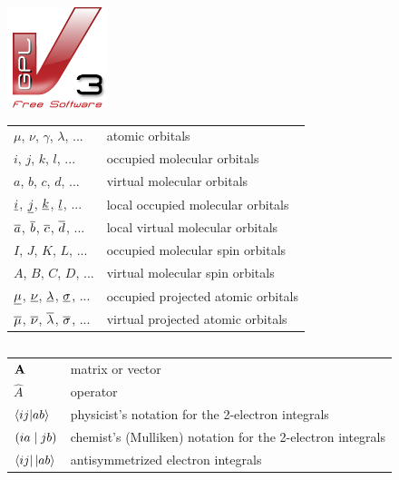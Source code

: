 \documentclass[a4paper,12pt]{book}
\begin{document}
\noindent 
\includegraphics[scale=1.0]{Pics/license}


\newpage

\newpage


{
\setlength{\tabcolsep}{14pt}
\renewcommand{\arraystretch}{1.5}
\begin{longtable}[l]{ll}
$\mu$, $\nu$, $\gamma$, $\lambda$, ... & atomic orbitals \\
$i$, $j$, $k$, $l$, ... & occupied molecular orbitals \\
$a$, $b$, $c$, $d$, ... & virtual molecular orbitals \\
$\underline{i}$, $\underline{j}$, $\underline{k}$, $\underline{l}$, ... & local occupied molecular orbitals \\
$\overline{a}$, $\overline{b}$, $\overline{c}$, $\overline{d}$, ... & local virtual molecular orbitals \\
$I$, $J$, $K$, $L$, ... & occupied molecular spin orbitals \\
$A$, $B$, $C$, $D$, ... & virtual molecular spin orbitals \\
$\underline{\mu}$, $\underline{\nu}$, $\underline{\lambda}$, $\underline{\sigma}$, ... & occupied projected atomic orbitals \\
$\overline{\mu}$, $\overline{\nu}$, $\overline{\lambda}$, $\overline{\sigma}$, ... & virtual projected atomic orbitals
\end{longtable}
}

\vspace{0.5cm}

{
\setlength{\tabcolsep}{14pt}
\renewcommand{\arraystretch}{1.5}
\begin{longtable}[l]{ll}

\end{longtable}
}


{
\setlength{\tabcolsep}{14pt}
\renewcommand{\arraystretch}{1.5}
\begin{longtable}[l]{ll}
$\mathbf{A}$ & matrix or vector \\
$\hat{A}$ & operator \\
$\bra{\smash{ij}}\ket{\smash{ab}}$ & physicist's notation for the 2-electron integrals \\
$\left( \smash{ia} \mid \smash{jb}\right)$ & chemist's (Mulliken) notation for the 2-electron integrals \\
$\sbra{ij}\sket{ab}$ & antisymmetrized electron integrals
\end{longtable}
}
\end{document}
